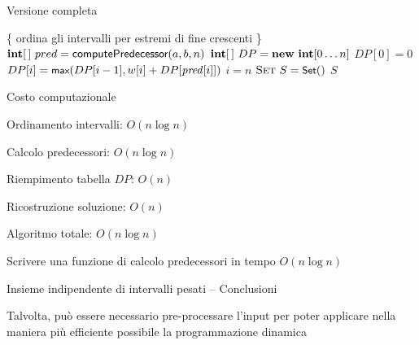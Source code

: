 \begin{frame}[shrink=10]{Versione completa}

\vspace{-9pt}
\begin{Procedure}
\caption[A]{\Set\ \maxinterval($\INTARRAY\ a,\ \INTARRAY\ b,\ \INTARRAY w$, \INTEGER $n$)}	

\{ ordina gli intervalli per estremi di fine crescenti \}\;
$\INTARRAY\ pred = \textsf{computePredecessor}(a,b,n)$\;
$\INTARRAY\ DP = \NEW\ \INTEGER[0 \mldots n]$\;
$DP[0] = 0$\;
{
  $DP[i] = \textsf{{\small max}}(DP[i-1], w[i] + DP[\mathit{pred}[i]])$\;
}
$i = n$\;
$\textsc{Set}\ S = \textsf{{\small Set}}()$\;
{
}
\Return $S$\;
\end{Procedure}

\end{frame}

\begin{frame}{Costo computazionale}

\vspace{-9pt}
\BIL
\item Ordinamento intervalli: \alert{$O(n \log n)$}
\item Calcolo predecessori: \alert{$O(n \log n)$}
\item Riempimento tabella $DP$: \alert{$O(n)$}
\item Ricostruzione soluzione: \alert{$O(n)$}
\item Algoritmo totale: \alert{$O(n \log n)$}
\EIL

Scrivere una funzione di calcolo predecessori in tempo $O(n \log n)$

\end{frame}

\begin{frame}{Insieme indipendente di intervalli pesati -- Conclusioni}

\vspace{-9pt}
\begin{myboxtitle}
Talvolta, può essere necessario pre-processare l'input per poter applicare nella maniera più efficiente possibile la programmazione dinamica
\end{myboxtitle}

\end{frame}

